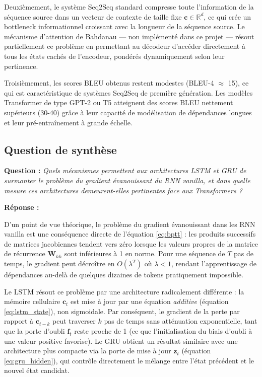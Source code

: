 \documentclass[11pt,a4paper]{article}
\begin{document}
Deuxièmement, le système Seq2Seq standard compresse toute l'information de la séquence
source dans un vecteur de contexte de taille fixe $\mathbf{c} \in \mathbb{R}^d$, ce
qui crée un bottleneck informationnel croissant avec la longueur de la séquence source.
Le mécanisme d'attention de Bahdanau \cite{bahdanau2014neural} — non implémenté dans
ce projet — résout partiellement ce problème en permettant au décodeur d'accéder
directement à tous les états cachés de l'encodeur, pondérés dynamiquement selon leur
pertinence.

Troisièmement, les scores BLEU obtenus restent modestes (BLEU-4 $\approx$ 15),
ce qui est caractéristique de systèmes Seq2Seq de première génération. Les modèles
Transformer de type GPT-2 ou T5 atteignent des scores BLEU nettement supérieurs (30-40)
grâce à leur capacité de modélisation de dépendances longues et leur pré-entraînement
à grande échelle.

\subsection{Question de synthèse}

\textbf{Question :} \textit{Quels mécanismes permettent aux architectures LSTM et GRU
de surmonter le problème du gradient évanouissant du RNN vanilla, et dans quelle mesure
ces architectures demeurent-elles pertinentes face aux Transformers ?}

\textbf{Réponse :}

D'un point de vue théorique, le problème du gradient évanouissant dans les RNN vanilla
est une conséquence directe de l'équation \eqref{eq:bptt} : les produits successifs
de matrices jacobiennes tendent vers zéro lorsque les valeurs propres de la matrice
de récurrence $\mathbf{W}_{hh}$ sont inférieures à 1 en norme. Pour une séquence de
$T$ pas de temps, le gradient peut décroître en $O(\lambda^T)$ où $\lambda < 1$,
rendant l'apprentissage de dépendances au-delà de quelques dizaines de tokens
pratiquement impossible.

Le LSTM résout ce problème par une architecture radicalement différente : la mémoire
cellulaire $\mathbf{c}_t$ est mise à jour par une équation \textit{additive}
(équation \eqref{eq:lstm_state}), non sigmoidale. Par conséquent, le gradient de la
perte par rapport à $\mathbf{c}_{t-k}$ peut traverser $k$ pas de temps sans atténuation
exponentielle, tant que la porte d'oubli $\mathbf{f}_t$ reste proche de 1 (ce que
l'initialisation du biais d'oubli à une valeur positive favorise). Le GRU obtient un
résultat similaire avec une architecture plus compacte via la porte de mise à jour
$\mathbf{z}_t$ (équation \eqref{eq:gru_hidden}), qui contrôle directement le mélange
entre l'état précédent et le nouvel état candidat.
\end{document}
